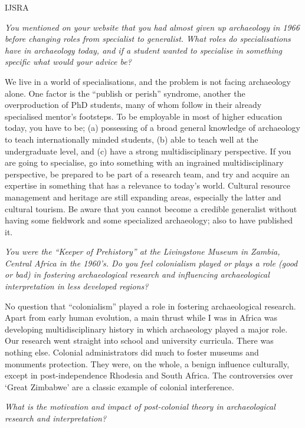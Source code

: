 \begin{labeling}{IJSRA}
\item[IJSRA]\textit{You mentioned on your website that you had almost given up archaeology in 1966 before changing roles from specialist to generalist.  What roles do specialisations have in archaeology today, and if a student wanted to specialise in something specific what would your advice be?}

\item[BMF] We live in a world of specialisations, and the problem is not facing archaeology alone. One factor is the “publish or perish” syndrome, another the overproduction of PhD students, many of whom follow in their already specialised mentor’s footsteps. To be employable in most of higher education today, you have to be; (a) possessing of a broad general knowledge of archaeology to teach internationally minded students, (b) able to teach well at the undergraduate level, and (c) have a strong multidisciplinary perspective. If you are going to specialise, go into something with an ingrained multidisciplinary perspective, be prepared to be part of a research team, and try and acquire an expertise in something that has a relevance to today’s world. Cultural resource management and heritage are still expanding areas, especially the latter and cultural tourism. Be aware that you cannot become a credible generalist without having some fieldwork and some specialized archaeology; also to have published it.	

\item[IJSRA]\textit{You were the “Keeper of Prehistory” at the Livingstone Museum in Zambia, Central Africa in the 1960’s. Do you feel colonialism played or plays a role (good or bad) in fostering archaeological research and influencing archaeological interpretation in less developed regions?}

\item[BMF] No question that “colonialism” played a role in fostering archaeological research. Apart from early human evolution, a main thrust while I was in Africa was developing multidisciplinary history in which archaeology played a major role. Our research went straight into school and university curricula. There was nothing else. Colonial administrators did much to foster museums and monuments protection. They were, on the whole, a benign influence culturally, except in post-independence Rhodesia and South Africa. The controversies over ‘Great Zimbabwe’ are a classic example of colonial interference.

\item[IJSRA] \textit{What is the motivation and impact of post-colonial theory in archaeological research and interpretation?}


\end{labeling}
